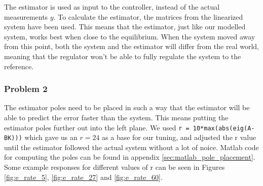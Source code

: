 The estimator is used as input to the controller, instead of the actual measurements $y$. To calculate the estimator, the matrices from the linearized system have been used. This means that the estimator, just like our modelled system, works best when close to the equilibrium. When the system moved away from this point, both the system and the estimator will differ from the real world, meaning that the regulator won't be able to fully regulate the system to the reference. 



\subsubsection{Problem 2}
The estimator poles need to be placed in such a way that the estimator will be able to predict the error faster than the system. This means putting the estimator poles further out into the left plane. We used \texttt{r = 10*max(abs(eig(A-BK)))} which gave us an $r = 24$ as a base for our tuning, and adjusted the r value until the estimator followed the actual system without a lot of noice. Matlab code for computing the poles can be found in appendix \ref{sec:matlab_pole_placement}. Some example responses for different values of r can be seen in Figures \ref{fig:e_rate_5}, \ref{fig:e_rate_27} and \ref{fig:e_rate_60}.\\


